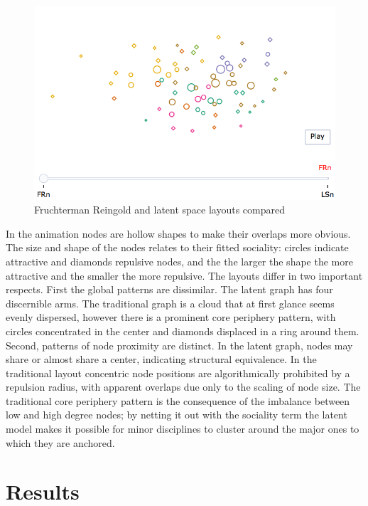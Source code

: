 \documentclass[]{book}
\theoremstyle{definition}
\theoremstyle{definition}
\theoremstyle{definition}
\theoremstyle{remark}
\begin{document}
\begin{figure}

{\centering \includegraphics[width=0.9\linewidth]{img/layouts} 

}

\caption{Fruchterman Reingold and latent space layouts compared}\label{fig:layouts}
\end{figure}

In the animation nodes are hollow shapes to make their overlaps more
obvious. The size and shape of the nodes relates to their fitted
sociality: circles indicate attractive and diamonds repulsive nodes, and
the the larger the shape the more attractive and the smaller the more
repulsive. The layouts differ in two important respects. First the
global patterns are dissimilar. The latent graph has four discernible
arms. The traditional graph is a cloud that at first glance seems evenly
dispersed, however there is a prominent core periphery pattern, with
circles concentrated in the center and diamonds displaced in a ring
around them. Second, patterns of node proximity are distinct. In the
latent graph, nodes may share or almost share a center, indicating
structural equivalence. In the traditional layout concentric node
positions are algorithmically prohibited by a repulsion radius, with
apparent overlaps due only to the scaling of node size. The traditional
core periphery pattern is the consequence of the imbalance between low
and high degree nodes; by netting it out with the sociality term the
latent model makes it possible for minor disciplines to cluster around
the major ones to which they are anchored.

\hypertarget{results}{%
\section{Results}\label{results}}
\end{document}
